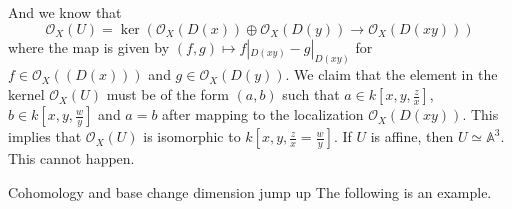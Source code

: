 \documentclass[12pt]{article}
\begin{document}
And we know that 
\[\mathcal{O}_X(U)=\ker (\mathcal{O}_X(D(x))\oplus \mathcal{O}_X(D(y))\rightarrow \mathcal{O}_X(D(xy)))\]
where the map is given by \((f,g)\mapsto f|_{D(xy)}-g|_{D(xy)}\) for \(f\in \mathcal{O}_X((D(x)))\) and \(g\in \mathcal{O}_X(D(y))\). We claim that the element in the kernel \(\mathcal{O}_X(U)\) must be of the form \((a,b)\) such that \(a\in k[x,y,\frac{z}{x}]\), \(b\in k[x,y,\frac{w}{y}]\) and \(a=b\) after mapping to the localization \(\mathcal{O}_X(D(xy))\). This implies that \(\mathcal{O}_X(U)\) is isomorphic to \(k[x,y,\frac{z}{x}=\frac{w}{y}]\). If \(U\) is affine, then \(U\simeq \mathbb{A}^3\). This cannot happen. 

\begin{Topics}{Cohomology and base change dimension jump up}
  The following is an example.
\end{Topics}
\end{document}
